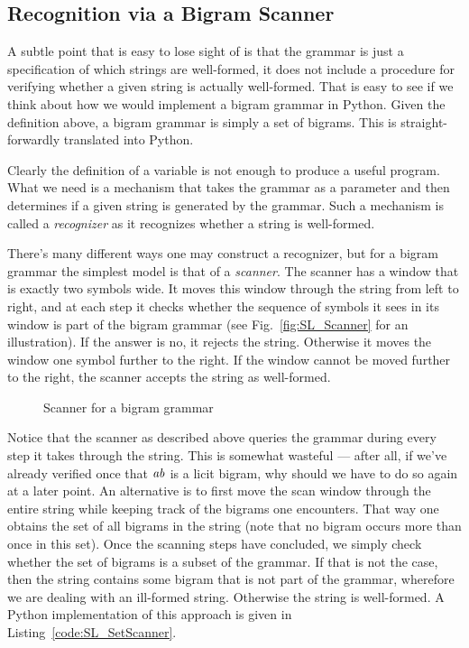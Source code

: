 \subsection{Recognition via a Bigram Scanner}
A subtle point that is easy to lose sight of is that the grammar is just a specification of which strings are well-formed, it does not include a procedure for verifying whether a given string is actually well-formed.
That is easy to see if we think about how we would implement a bigram grammar in Python.
Given the definition above, a bigram grammar is simply a set of bigrams.
This is straight-forwardly translated into Python.
%
\begin{center}
\end{center}
%
Clearly the definition of a variable is not enough to produce a useful program.
What we need is a mechanism that takes the grammar as a parameter and then determines if a given string is generated by the grammar.
Such a mechanism is called a \emph{recognizer} as it recognizes whether a string is well-formed.

There's many different ways one may construct a recognizer, but for a bigram grammar the simplest model is that of a \emph{scanner}.
The scanner has a window that is exactly two symbols wide.
It moves this window through the string from left to right, and at each step it checks whether the sequence of symbols it sees in its window is part of the bigram grammar (see Fig.~\vref{fig:SL_Scanner} for an illustration).
If the answer is no, it rejects the string.
Otherwise it moves the window one symbol further to the right.
If the window cannot be moved further to the right, the scanner accepts the string as well-formed.
%
\begin{figure}[tbph]
\centering

\caption{Scanner for a bigram grammar}
\label{fig:SL_Scanner}
\end{figure}

Notice that the scanner as described above queries the grammar during every step it takes through the string.
This is somewhat wasteful --- after all, if we've already verified once that $\mathit{ab}$ is a licit bigram, why should we have to do so again at a later point.
An alternative is to first move the scan window through the entire string while keeping track of the bigrams one encounters.
That way one obtains the set of all bigrams in the string (note that no bigram occurs more than once in this set).
Once the scanning steps have concluded, we simply check whether the set of bigrams is a subset of the grammar.
If that is not the case, then the string contains some bigram that is not part of the grammar, wherefore we are dealing with an ill-formed string. 
Otherwise the string is well-formed.
A Python implementation of this approach is given in Listing~\vref{code:SL_SetScanner}.

